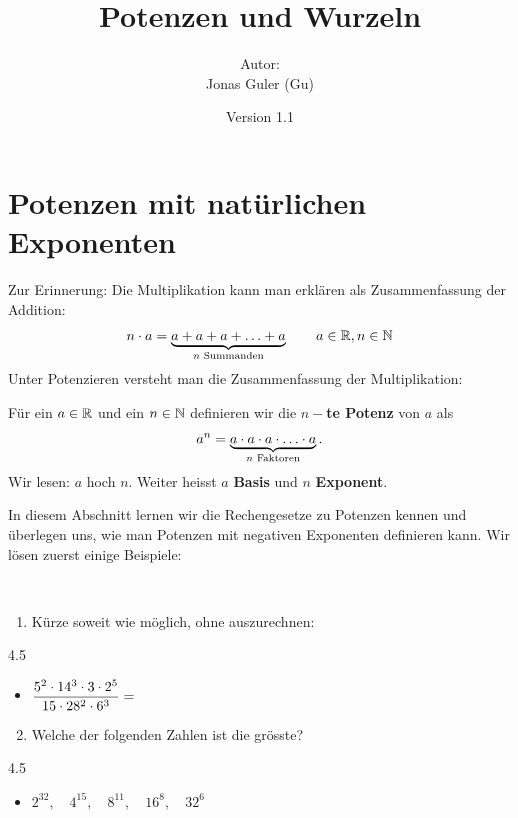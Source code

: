 \documentclass[11pt,oneside]{article}
\newcommand{\Skriptname}{Potenzen und Wurzeln}
\newcommand{\Autor}{Jonas Guler (Gu)}
\begin{document}
\begin{titlepage}
	\clearpage
	\title{\Huge\textbf{\Skriptname} \\[1cm]}
	\author{Autor:\\ \Autor}
	\date{\normalsize{Version 1.1\\ \datelong}}
	\maketitle
    \thispagestyle{empty}
    \vfill
    \tableofcontents
\end{titlepage}
\section{Potenzen mit natürlichen Exponenten}
    Zur Erinnerung: Die Multiplikation kann man erklären als Zusammenfassung der Addition:
    \[n\cdot a=\underbrace{a+a+a+\ldots+a}_{n \text{ Summanden}}\qquad a\in\mathbb{R}, n\in\mathbb{N}\]
    Unter Potenzieren versteht man die Zusammenfassung der Multiplikation:
    \begin{definition}
        Für ein $a\in\mathbb{R}$ und ein $n\in\mathbb{N}$ definieren wir die \textbf{$n-$te Potenz} von $a$ als
        \[a^{n}=\underbrace{a\cdot a\cdot a\cdot\ldots\cdot a}_{n \text{ Faktoren}}.\]
        Wir lesen: \glqq $a$ hoch $n$\grqq\:. Weiter heisst $a$ \textbf{Basis} und $n$ \textbf{Exponent}.
    \end{definition}
    In diesem Abschnitt lernen wir die Rechengesetze zu Potenzen kennen und überlegen uns, wie man Potenzen mit negativen Exponenten definieren kann. Wir lösen zuerst einige Beispiele:
    \begin{beispiel}\ 
    	\begin{enumerate}[label=\alph*)]
        	\item Kürze soweit wie möglich, ohne auszurechnen:
        \end{enumerate}
        \begin{gridspace}{4.5}
        	\begin{itemize}[label=\ ]\vspace*{-3mm}
        		\item $\displaystyle\frac{5^{2}\cdot14^{3}\cdot3\cdot2^{5}}{15\cdot28^{2}\cdot6^{3}}=$
        	\end{itemize}
        \end{gridspace}
        \begin{enumerate}[label=\alph*)]
        	\setcounter{enumi}{1}
        	\item Welche der folgenden Zahlen ist die grösste?
    	\end{enumerate}
    	\begin{gridspace}{4.5}
    		\begin{itemize}[label=\ ,leftmargin=5cm]
    			\item $2^{32},\quad4^{15},\quad8^{11},\quad16^8,\quad32^6$
    		\end{itemize}
    	\end{gridspace}
    \end{beispiel}
\end{document}
